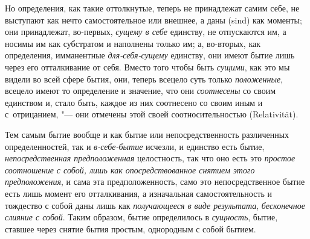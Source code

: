 Но определения, как такие оттолкнутые, теперь не принадлежат самим себе, не
выступают как нечто самостоятельное или внешнее, а даны (sind) как моменты; они
принадлежат, во-первых, {\em сущему в себе} единству, не отпускаются им, а
носимы им как субстратом и наполнены только им; а, во-вторых, как определения,
имманентные {\em для-себя-сущему} единству, они имеют бытие лишь через его
отталкивание от себя. Вместо того чтобы быть {\em сущими}, как это мы видели во
всей сфере бытия, они, теперь всецело суть только {\em положенные}, всецело
имеют то определение и значение, что они {\em соотнесены} со своим единством и,
стало быть, каждое из них соотнесено со своим иным и с~отрицанием, "--- они
отмечены этой своей соотносительностью (Rela\-tivi\-tät).

Тем самым бытие вообще и как бытие или непосредственность различенных
определенностей, так и {\em в-себе-бытие} исчезли, и единство есть бытие,
{\em непосредственная предположенная} целостность, так что оно есть это
{\em простое соотношение с собой, лишь как опосредствованное снятием
этого предположения}, и сама эта предположенность, само это непосредственное
бытие есть лишь момент его отталкивания, а изначальная самостоятельность и
тождество с собой даны лишь как {\em получающееся в виде результата},
{\em бесконечное слияние с собой}. Таким образом, бытие определилось в
{\em сущность}, бытие, ставшее через снятие бытия простым, однородным с собой
бытием.
